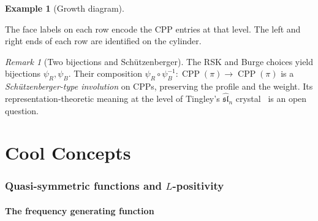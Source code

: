 \documentclass[11pt]{article}
\theoremstyle{plain}
\theoremstyle{definition}
\newtheorem{example}[theorem]{Example}
\theoremstyle{remark}
\newtheorem{remark}[theorem]{Remark}
\newcommand{\CPP}{\operatorname{CPP}}
\begin{document}
\begin{example}[Growth diagram]
\begin{center}
\end{center}
The face labels on each row encode the CPP entries at
that level.  The left and right ends of each row are
identified on the cylinder.
\end{example}

\begin{remark}[Two bijections and Sch\"utzenberger]\label{rem:two-bijections}
The RSK and Burge choices yield bijections $\psi_R, \psi_B$.
Their composition
$\psi_R \circ \psi_B^{-1} : \CPP(\pi) \to \CPP(\pi)$
is a \emph{Sch\"utzenberger-type involution} on CPPs,
preserving the profile and the weight.
Its representation-theoretic meaning at the level of
Tingley's $\widehat{\mathfrak{sl}}_n$
crystal~\cite{tingley-2007} is an open question.
\end{remark}


\part{Cool Concepts}
\label{part:concepts}

\section{Quasi-symmetric functions and $L$-positivity}
\label{sec:qsym}

\subsection{The frequency generating function}
\end{document}
